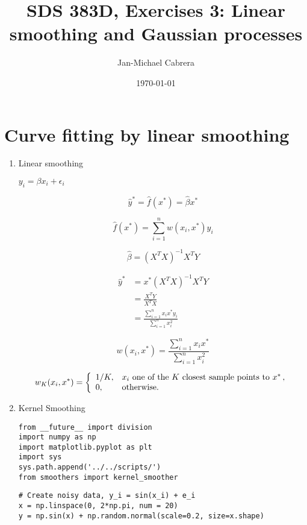 \documentclass[10pt]{article}
\begin{document}
    \title{SDS 383D, Exercises 3: Linear smoothing and Gaussian processes}
    \author{Jan-Michael Cabrera}
    \date{\today}
    \maketitle

    \section*{Curve fitting by linear smoothing}

    \begin{enumerate}[label=(\Alph*)]
      \item Linear smoothing

        $y_i = \beta x_i + \epsilon_i$

        $$\hat{y}^* = \hat{f}(x^*) = \hat{\beta} x^*$$

        $$\hat{f}(x^*) = \sum_{i=1}^n w(x_i, x^*) y_i$$

        $$\hat{\beta} = (X^T X)^{-1} X^T Y$$

        \begin{align*}
            \hat{y}^* &= x^* (X^T X)^{-1} X^T Y \\
            &= \frac{X^T Y}{X^T X} \\
            &= \frac{\sum_{i=1}^n x_i x^* y_i}{\sum_{i=1}^n x_i^2}
        \end{align*}

        $$w(x_i, x^*) = \frac{\sum_{i=1}^n x_i x^*}{\sum_{i=1}^n x_i^2}$$

        $$
        w_K(x_i, x^*) = \left \{
        \begin{array}{l l}
        1/K, & \mbox{$x_i$ one of the $K$ closest sample points to $x^*$} \, ,\\
        0, & \mbox{otherwise.} \\
        \end{array}
        \right.
        $$

      \item Kernel Smoothing

        \begin{lstlisting}
from __future__ import division
import numpy as np 
import matplotlib.pyplot as plt
import sys
sys.path.append('../../scripts/')
from smoothers import kernel_smoother
        \end{lstlisting}

        \begin{lstlisting}
# Create noisy data, y_i = sin(x_i) + e_i
x = np.linspace(0, 2*np.pi, num = 20)
y = np.sin(x) + np.random.normal(scale=0.2, size=x.shape)


\end{lstlisting}
\end{enumerate}
\end{document}

